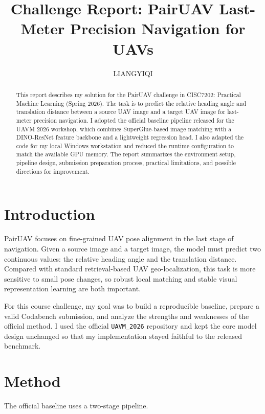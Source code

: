 \documentclass[sigconf]{acmart}
\begin{document}
\title{Challenge Report: PairUAV Last-Meter Precision Navigation for UAVs}

\author{LIANGYIQI}

\begin{abstract}
This report describes my solution for the PairUAV challenge in CISC7202: Practical Machine Learning (Spring 2026). The task is to predict the relative heading angle and translation distance between a source UAV image and a target UAV image for last-meter precision navigation. I adopted the official baseline pipeline released for the UAVM 2026 workshop, which combines SuperGlue-based image matching with a DINO-ResNet feature backbone and a lightweight regression head. I also adapted the code for my local Windows workstation and reduced the runtime configuration to match the available GPU memory. The report summarizes the environment setup, pipeline design, submission preparation process, practical limitations, and possible directions for improvement.
\end{abstract}

\maketitle

\section{Introduction}
PairUAV focuses on fine-grained UAV pose alignment in the last stage of navigation. Given a source image and a target image, the model must predict two continuous values: the relative heading angle and the translation distance. Compared with standard retrieval-based UAV geo-localization, this task is more sensitive to small pose changes, so robust local matching and stable visual representation learning are both important.

For this course challenge, my goal was to build a reproducible baseline, prepare a valid Codabench submission, and analyze the strengths and weaknesses of the official method. I used the official \texttt{UAVM\_2026} repository and kept the core model design unchanged so that my implementation stayed faithful to the released benchmark.

\section{Method}
The official baseline uses a two-stage pipeline.
\end{document}
